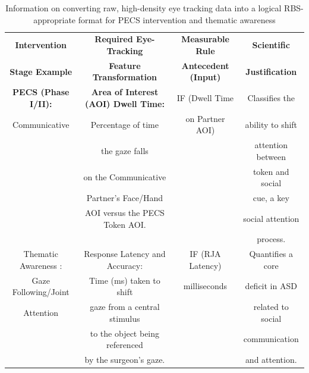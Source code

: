 \begin{table}[h]
    \caption{Information on converting raw, high-density eye tracking data into a logical RBS-appropriate format for PECS intervention and thematic awareness}
    \centering
    \begin{tabular}{|c|c|c|c|}
    \hline
         \textbf{Intervention}& \textbf{Required Eye-Tracking } & \textbf{Measurable Rule} & \textbf{Scientific}\\
         \textbf{ Stage Example}& \textbf{Feature Transformation} & \textbf{ Antecedent (Input)} & \textbf{Justification}\\ \hline
         \textbf{PECS (Phase I/II):} & \textbf{Area of Interest (AOI) Dwell Time:} & IF (Dwell Time & Classifies the  \\ 
          Communicative & Percentage of time & on Partner AOI) & ability to shift\\ 
          & the gaze falls &  &  attention between\\
          & on the Communicative  &  & token and social\\
          & Partner's Face/Hand&  & cue, a key\\
           &AOI versus the PECS Token AOI. &  & social attention\\
           & &  & process.\\
          \hline
         Thematic Awareness : & Response Latency and Accuracy:  & IF (RJA Latency) & Quantifies a core\\ 
           Gaze Following/Joint & Time (ms) taken to shift &  milliseconds &  deficit in ASD \\
            Attention & gaze from a central stimulus &  & related to social \\
              & to the object being referenced &  & communication\\
                & by the surgeon's gaze. &  &  and attention. \\
          \hline
    \end{tabular}
    \label{tba}
\end{table}